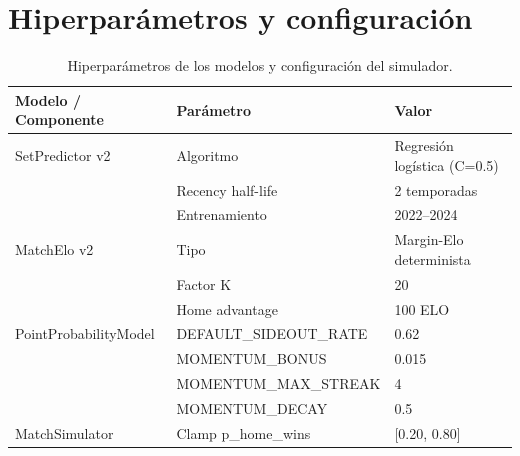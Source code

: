 \chapter{Hiperpar\'ametros y configuraci\'on}
\label{app:hiperparametros}

\begin{table}[htbp]
\centering
\caption{Hiperpar\'ametros de los modelos y configuraci\'on del simulador.}
\label{tab:hiperparametros}
\begin{tabular}{@{}lll@{}}
\toprule
\textbf{Modelo / Componente} & \textbf{Par\'ametro} & \textbf{Valor} \\
\midrule
SetPredictor v2 & Algoritmo & Regresi\'on log\'istica (C=0.5) \\
 & Recency half-life & 2 temporadas \\
 & Entrenamiento & 2022--2024 \\
\midrule
MatchElo v2 & Tipo & Margin-Elo determinista \\
 & Factor K & 20 \\
 & Home advantage & 100 ELO \\
\midrule
PointProbabilityModel & DEFAULT\_SIDEOUT\_RATE & 0.62 \\
 & MOMENTUM\_BONUS & 0.015 \\
 & MOMENTUM\_MAX\_STREAK & 4 \\
 & MOMENTUM\_DECAY & 0.5 \\
\midrule
MatchSimulator & Clamp p\_home\_wins & [0.20, 0.80] \\
\bottomrule
\end{tabular}
\end{table}

